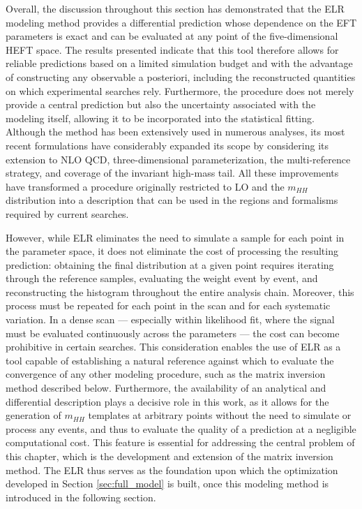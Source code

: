 Overall, the discussion throughout this section has demonstrated that the ELR modeling method provides a differential prediction whose dependence on the EFT parameters is exact and can be evaluated at any point of the five-dimensional HEFT space. The results presented indicate that this tool therefore allows for reliable predictions based on a limited simulation budget and with the advantage of constructing any observable a posteriori, including the reconstructed quantities on which experimental searches rely. Furthermore, the procedure does not merely provide a central prediction but also the uncertainty associated with the modeling itself, allowing it to be incorporated into the statistical fitting. Although the method has been extensively used in numerous analyses, its most recent formulations have considerably expanded its scope by considering its extension to NLO QCD, three-dimensional parameterization, the multi-reference strategy, and coverage of the invariant high-mass tail. All these improvements have transformed a procedure originally restricted to LO and the $m_{HH}$ distribution into a description that can be used in the regions and formalisms required by current searches.

However, while ELR eliminates the need to simulate a sample for each point in the parameter space, it does not eliminate the cost of processing the resulting prediction: obtaining the final distribution at a given point requires iterating through the reference samples, evaluating the weight event by event, and reconstructing the histogram throughout the entire analysis chain. Moreover, this process must be repeated for each point in the scan and for each systematic variation. In a dense scan — especially within likelihood fit, where the signal must be evaluated continuously across the parameters — the cost can become prohibitive in certain searches. This consideration enables the use of ELR as a tool capable of establishing a natural reference against which to evaluate the convergence of any other modeling procedure, such as the matrix inversion method described below. Furthermore, the availability of an analytical and differential description plays a decisive role in this work, as it allows for the generation of $m_{HH}$ templates at arbitrary points without the need to simulate or process any events, and thus to evaluate the quality of a prediction at a negligible computational cost. This feature is essential for addressing the central problem of this chapter, which is the development and extension of the matrix inversion method. The ELR thus serves as the foundation upon which the optimization developed in Section \ref{sec:full_model} is built, once this modeling method is introduced in the following section.


